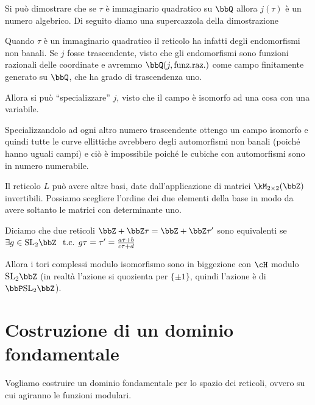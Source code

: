 \begin{divagazione}
  Si può dimostrare che se $\tau$ è immaginario quadratico su $\bbQ$ allora
  $j(\tau)$ è un numero algebrico. Di seguito diamo una supercazzola della dimostrazione

  Quando $\tau$ è un immaginario quadratico il reticolo ha infatti degli
  endomorfismi non banali. Se $j$ fosse trascendente, visto che gli
  endomorfismi sono funzioni razionali delle coordinate e avremmo
  $\bbQ(j, \text{funz.raz.})$ come campo finitamente generato su $\bbQ$,
  che ha grado di trascendenza uno.

  Allora si può ``specializzare'' $j$, visto che il campo è isomorfo ad
  una cosa con una variabile.


  Specializzandolo ad ogni altro numero trascendente ottengo un campo
  isomorfo e quindi tutte le curve ellittiche avrebbero degli
  automorfismi non banali (poiché hanno uguali campi) e ciò è
  impossibile poiché le cubiche con automorfismi sono in numero
  numerabile.
\end{divagazione}

Il reticolo $L$ può avere altre basi, date dall'applicazione di matrici
$\kM_{2 \times 2} (\bbZ)$ invertibili. Possiamo scegliere l'ordine dei
due elementi della base in modo da avere soltanto le matrici con
determinante uno.

Diciamo che due reticoli $\bbZ + \bbZ \tau = \bbZ + \bbZ \tau'$ sono
equivalenti se $\exists g \in \SL_2 \bbZ$
$\text{ t.c. } g\tau = \tau' = \frac{a \tau + b}{c \tau + d}$

Allora i tori complessi modulo isomorfismo sono in biggezione con $\cH$
modulo $\SL_2 \bbZ$ (in realtà l'azione si quozienta per $\{\pm 1\}$,
quindi l'azione è di $\bbP\SL_2 \bbZ$).

\section{Costruzione di un dominio fondamentale}

Vogliamo costruire un dominio fondamentale per lo spazio dei reticoli,
ovvero su cui agiranno le funzioni modulari.

